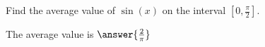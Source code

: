 \documentclass{ximera}
\author{Steven Gubkin}
\begin{document}
\begin{exercise}



Find the average value of $\sin(x)$ on the interval $[0,\frac{\pi}{2}]$.

\begin{prompt}
	The average value is $\answer{\frac{2}{\pi}}$
\end{prompt}

\end{exercise}
\end{document}
